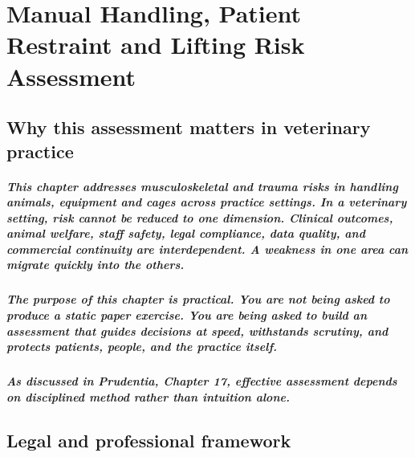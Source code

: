 \chapter{Manual Handling, Patient Restraint and Lifting Risk Assessment}
\label{chap:Manual Handling, Patient Restraint and Lifting Risk Assessment}

\section{Why this assessment matters in veterinary practice}

\paragraph{This chapter addresses musculoskeletal and trauma risks in handling animals, equipment and cages across practice settings. In a veterinary setting, risk cannot be reduced to one dimension. Clinical outcomes, animal welfare, staff safety, legal compliance, data quality, and commercial continuity are interdependent. A weakness in one area can migrate quickly into the others.}

\paragraph{The purpose of this chapter is practical. You are not being asked to produce a static paper exercise. You are being asked to build an assessment that guides decisions at speed, withstands scrutiny, and protects patients, people, and the practice itself.}

\paragraph{As discussed in Prudentia, Chapter 17, effective assessment depends on disciplined method rather than intuition alone.}



\section{Legal and professional framework}

